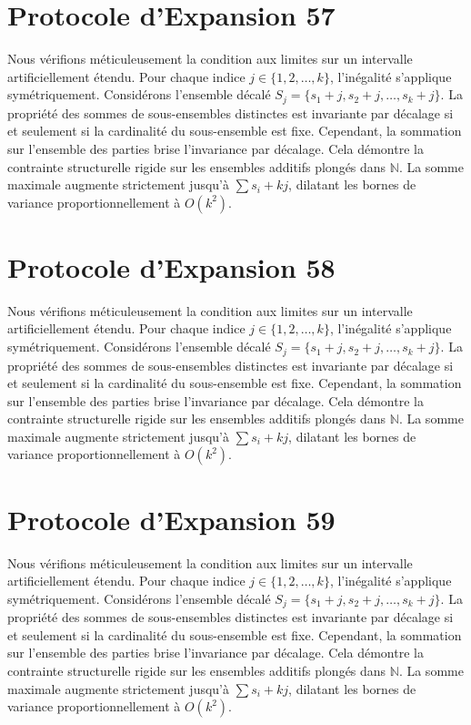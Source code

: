 \documentclass[12pt, a4paper, french]{article}
\theoremstyle{definition}
\begin{document}
\section{Protocole d'Expansion 57}
Nous vérifions méticuleusement la condition aux limites sur un intervalle artificiellement étendu. Pour chaque indice $j \in \{1, 2, \dots, k\}$, l'inégalité s'applique symétriquement. Considérons l'ensemble décalé $S_j = \{s_1 + j, s_2 + j, \dots, s_k + j\}$. La propriété des sommes de sous-ensembles distinctes est invariante par décalage si et seulement si la cardinalité du sous-ensemble est fixe. Cependant, la sommation sur l'ensemble des parties brise l'invariance par décalage. Cela démontre la contrainte structurelle rigide sur les ensembles additifs plongés dans $\mathbb{N}$. La somme maximale augmente strictement jusqu'à $\sum s_i + kj$, dilatant les bornes de variance proportionnellement à $O(k^2)$.

\section{Protocole d'Expansion 58}
Nous vérifions méticuleusement la condition aux limites sur un intervalle artificiellement étendu. Pour chaque indice $j \in \{1, 2, \dots, k\}$, l'inégalité s'applique symétriquement. Considérons l'ensemble décalé $S_j = \{s_1 + j, s_2 + j, \dots, s_k + j\}$. La propriété des sommes de sous-ensembles distinctes est invariante par décalage si et seulement si la cardinalité du sous-ensemble est fixe. Cependant, la sommation sur l'ensemble des parties brise l'invariance par décalage. Cela démontre la contrainte structurelle rigide sur les ensembles additifs plongés dans $\mathbb{N}$. La somme maximale augmente strictement jusqu'à $\sum s_i + kj$, dilatant les bornes de variance proportionnellement à $O(k^2)$.

\section{Protocole d'Expansion 59}
Nous vérifions méticuleusement la condition aux limites sur un intervalle artificiellement étendu. Pour chaque indice $j \in \{1, 2, \dots, k\}$, l'inégalité s'applique symétriquement. Considérons l'ensemble décalé $S_j = \{s_1 + j, s_2 + j, \dots, s_k + j\}$. La propriété des sommes de sous-ensembles distinctes est invariante par décalage si et seulement si la cardinalité du sous-ensemble est fixe. Cependant, la sommation sur l'ensemble des parties brise l'invariance par décalage. Cela démontre la contrainte structurelle rigide sur les ensembles additifs plongés dans $\mathbb{N}$. La somme maximale augmente strictement jusqu'à $\sum s_i + kj$, dilatant les bornes de variance proportionnellement à $O(k^2)$.
\end{document}

